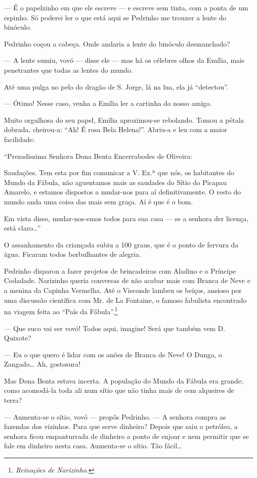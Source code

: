 --- É o papelzinho em que ele escreve --- e escreve sem tinta, com a
ponta de um espinho. Só poderei ler o que está aqui se Pedrinho me
trouxer a lente do binóculo.

Pedrinho coçou a cabeça. Onde andaria a lente do binóculo desmanchado?

--- A lente sumiu, vovó --- disse ele --- mas há os célebres olhos da
Emília, mais penetrantes que todas as lentes do mundo.

Até uma pulga no pelo do dragão de S. Jorge, lá na lua, ela já
``detectou''.

--- Ótimo! Nesse caso, venha a Emília ler a cartinha do nosso amigo.

Muito orgulhosa do seu papel, Emília aproximou-se rebolando. Tomou a
pétala dobrada, cheirou-a: ``Ah! É rosa Bela Helena!''. Abriu-a e leu
com a maior facilidade:

``Prezadíssima Senhora Dona Benta Encerrabodes de Oliveira:

Saudações. Tem esta por fim comunicar a V. Ex.ª que nós, os habitantes
do Mundo da Fábula, não aguentamos mais as saudades do Sítio do Picapau
Amarelo, e estamos dispostos a mudar-nos para aí definitivamente. O
resto do mundo anda uma coisa das mais sem graça. Aí é que é o bom.

Em vista disso, mudar-nos-emos todos para sua casa --- se a senhora der
licença, está claro\ldots{}''

O assanhamento da criançada subiu a 100 graus, que é o ponto de fervura
da água. Ficaram todos borbulhantes de alegria.

Pedrinho disparou a fazer projetos de brincadeiras com Aladino e o
Príncipe Codadade. Narizinho queria conversas de não acabar mais com
Branca de Neve e a menina da Capinha Vermelha. Até o Visconde lambeu os
beiços, ansioso por uma discussão científica com Mr. de La Fontaine, o
famoso fabulista encontrado na viagem feita ao ``País da
Fábula''.\footnote{\textit{Reinações de Narizinho}.}

--- Que suco vai ser vovó! Todos aqui, imagine! Será que também vem D.
Quixote?

--- Eu o que quero é lidar com os anões de Branca de Neve! O Dunga, o
Zangado\ldots{} Ah, gostosura!

Mas Dona Benta estava incerta. A população do Mundo da Fábula era
grande; como acomodá-la toda ali num sítio que não tinha mais de cem
alqueires de terra?

--- Aumenta-se o sítio, vovó --- propôs Pedrinho. --- A senhora compra
as fazendas dos vizinhos. Para que serve dinheiro? Depois que saiu o
petróleo, a senhora ficou empanturrada de dinheiro a ponto de enjoar e
nem permitir que se fale em dinheiro nesta casa. Aumenta-se o sítio. Tão
fácil\ldots{}

